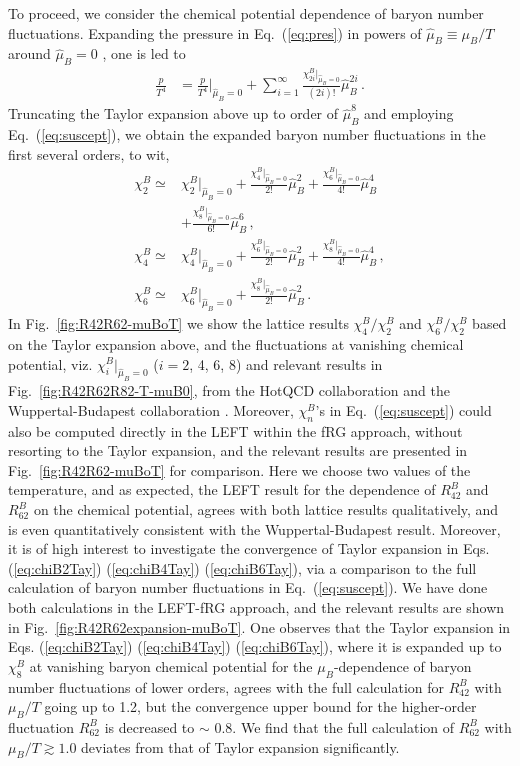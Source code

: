\documentclass[%
reprint,
superscriptaddress,
showpacs,preprintnumbers,
amsmath,amssymb,
aps,
prd,
]{revtex4-1}
\def\Fig#1{Fig.~\ref{#1}} \def\Tab#1{Tab.~\ref{#1}}
\def\Eq#1{Eq.~(\ref{#1})}
\begin{document}
	To proceed, we consider the chemical potential dependence of baryon number fluctuations. Expanding the pressure in \Eq{eq:pres} in powers of $\hat{\mu}_{B}\equiv\mu_B/T$ around $\hat{\mu}_{B}=0$ , one is led to 
	\begin{align}
		\frac{p}{T^4}&=\frac{p}{T^4}\Big|_{\hat{\mu}_{B}=0}+\sum_{i=1}^{\infty}\frac{\chi^B_{2i}|_{\hat{\mu}_{B}=0}}{(2i)!}\hat{\mu}_{B}^{2i}\,.\label{eq:cmu}
	\end{align}
	Truncating the Taylor expansion above up to order of $\hat{\mu}_{B}^{8}$ and employing \Eq{eq:suscept}, we obtain the expanded baryon number fluctuations in the first several orders, to wit,
	\begin{align}
		\chi^B_2\simeq&\chi^B_2|_{\hat{\mu}_{B}=0}+\frac{\chi^B_4|_{\hat{\mu}_{B}=0}}{2!}\hat{\mu}_{B}^{2}+\frac{\chi^B_6|_{\hat{\mu}_{B}=0}}{4!}\hat{\mu}_{B}^{4}\nonumber\\[2ex]
		&+\frac{\chi^B_8|_{\hat{\mu}_{B}=0}}{6!}\hat{\mu}_{B}^{6}\,,\label{eq:chiB2Tay}\\[2ex]
		\chi^B_4\simeq&\chi^B_4|_{\hat{\mu}_{B}=0}+\frac{\chi^B_6|_{\hat{\mu}_{B}=0}}{2!}\hat{\mu}_{B}^{2}+\frac{\chi^B_8|_{\hat{\mu}_{B}=0}}{4!}\hat{\mu}_{B}^{4}\,,\label{eq:chiB4Tay}\\[2ex]
		\chi^B_6\simeq&\chi^B_6|_{\hat{\mu}_{B}=0}+\frac{\chi^B_8|_{\hat{\mu}_{B}=0}}{2!}\hat{\mu}_{B}^{2}\,.\label{eq:chiB6Tay}
	\end{align}
	In \Fig{fig:R42R62-muBoT} we show the lattice results $\chi^B_4/\chi^B_2$ and $\chi^B_6/\chi^B_2$ based on the Taylor expansion above, and the fluctuations at vanishing chemical potential, viz. $\chi^B_{i}|_{\hat{\mu}_{B}=0}$ ($i=2$, 4, 6, 8) and relevant results in \Fig{fig:R42R62R82-T-muB0}, from the HotQCD collaboration \cite{Bazavov:2020bjn} and the Wuppertal-Budapest collaboration \cite{Borsanyi:2018grb}. Moreover, $\chi^B_n$'s in \Eq{eq:suscept} could also be computed directly in the LEFT within the fRG approach, without resorting to the Taylor expansion, and the relevant results are presented in \Fig{fig:R42R62-muBoT} for comparison. Here we choose two values of the temperature, and as expected, the LEFT result for the dependence of $R^{B}_{42}$ and $R^{B}_{62}$ on the chemical potential, agrees with both lattice results qualitatively, and is even quantitatively consistent with the Wuppertal-Budapest result. Moreover, it is of high interest to investigate the convergence of Taylor expansion in Eqs. (\ref{eq:chiB2Tay}) (\ref{eq:chiB4Tay}) (\ref{eq:chiB6Tay}), via a comparison to the full calculation of baryon number fluctuations in \Eq{eq:suscept}. We have done both calculations in the LEFT-fRG approach, and the relevant results are shown in \Fig{fig:R42R62expansion-muBoT}. One observes that the Taylor expansion in Eqs. (\ref{eq:chiB2Tay})  (\ref{eq:chiB4Tay})  (\ref{eq:chiB6Tay}), where it is expanded up to $\chi^B_8$ at vanishing baryon chemical potential for the $\mu_B$-dependence of baryon number fluctuations of lower orders, agrees with the full calculation for $R^{B}_{42}$ with $\mu_B/T$ going up to 1.2, but the convergence upper bound for the higher-order fluctuation $R^{B}_{62}$ is decreased to $\sim$ 0.8. We find that the full calculation of $R^{B}_{62}$ with $\mu_B/T \gtrsim 1.0$ deviates from that of Taylor expansion significantly.
\end{document}
